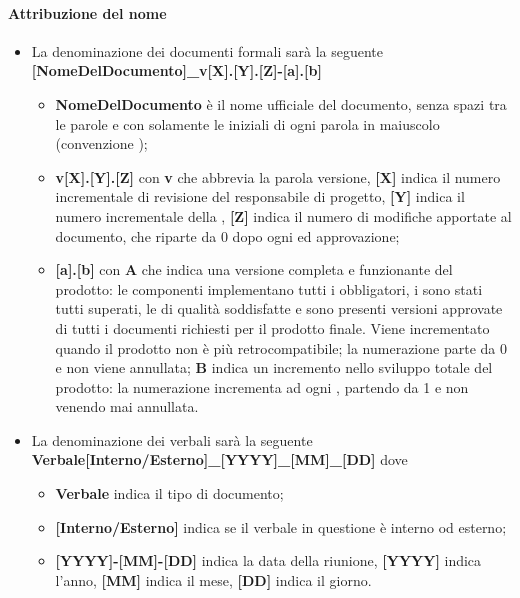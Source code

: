 {\paragraph*{Attribuzione del nome}
\begin{itemize}
	\item La denominazione dei documenti formali sarà la seguente \newline
	\textbf{[NomeDelDocumento]\_v[X].[Y].[Z]-[a].[b]}
	\begin{itemize}
		\item \textbf{NomeDelDocumento} è il nome ufficiale del documento, senza spazi tra le parole e con solamente le iniziali di ogni parola in maiuscolo (convenzione );
		\item \textbf{v[X].[Y].[Z]} con \textbf{v} che abbrevia la parola versione, \textbf{[X]} indica il numero incrementale di revisione del responsabile di progetto, \textbf{[Y]} indica il numero incrementale della , \textbf{[Z]} indica il numero di modifiche apportate al documento, che riparte da 0 dopo ogni  ed approvazione;
		\item \textbf{[a].[b]} con \textbf{A} che indica una versione completa e funzionante del prodotto: le componenti 
implementano tutti i  obbligatori, i  sono stati tutti superati, le  di qualità soddisfatte e sono presenti versioni approvate di tutti i documenti richiesti per il prodotto finale. Viene incrementato quando il prodotto  non è più retrocompatibile; la numerazione parte da 0 e non viene annullata; \textbf{B} indica un incremento nello sviluppo totale del prodotto: la numerazione incrementa ad ogni , partendo da 1 e non venendo mai annullata.
	\end{itemize}
	\item La denominazione dei verbali sarà la seguente\newline
	\textbf{Verbale[Interno/Esterno]\_[YYYY]\_[MM]\_[DD]}\newline
	dove
	\begin{itemize}
		\item \textbf{Verbale} indica il tipo di documento;
		\item \textbf{[Interno/Esterno]} indica se il verbale in questione è interno od esterno;
		\item \textbf{[YYYY]-[MM]-[DD]} indica la data della riunione, \textbf{[YYYY]} indica l'anno, \textbf{[MM]} indica il mese, \textbf{[DD]} indica il giorno.
	\end{itemize}
\end{itemize}
}
